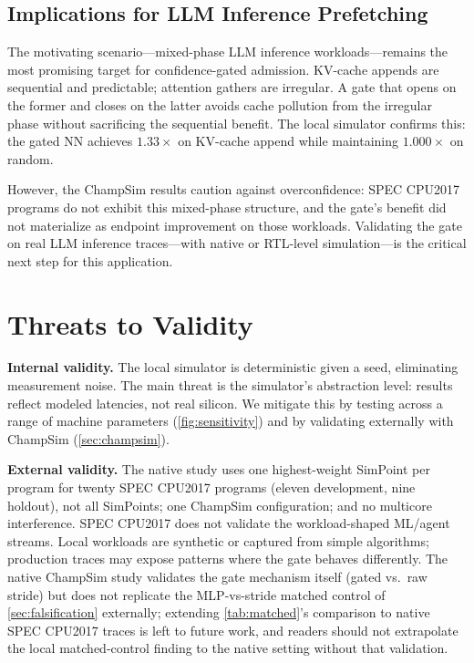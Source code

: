 \documentclass[sigplan,anonymous,review,nonacm]{acmart}
\begin{document}
\subsection{Implications for LLM Inference Prefetching}

The motivating scenario---mixed-phase LLM inference workloads---remains
the most promising target for confidence-gated admission. KV-cache appends
are sequential and predictable; attention gathers are irregular. A gate
that opens on the former and closes on the latter avoids cache pollution
from the irregular phase without sacrificing the sequential benefit. The
local simulator confirms this: the gated NN achieves $1.33\times$ on
KV-cache append while maintaining $1.000\times$ on random.

However, the ChampSim results caution against overconfidence: SPEC CPU2017
programs do not exhibit this mixed-phase structure, and the gate's benefit
did not materialize as endpoint improvement on those workloads. Validating
the gate on real LLM inference traces---with native or RTL-level
simulation---is the critical next step for this application.

\section{Threats to Validity}
\label{sec:threats}

\textbf{Internal validity.} The local simulator is deterministic given a
seed, eliminating measurement noise. The main threat is the simulator's
abstraction level: results reflect modeled latencies, not real silicon. We
mitigate this by testing across a range of machine parameters
(\cref{fig:sensitivity}) and by validating externally with
ChampSim (\cref{sec:champsim}).

\textbf{External validity.} The native study uses one highest-weight
SimPoint per program for twenty SPEC CPU2017 programs (eleven development,
nine holdout), not all SimPoints; one ChampSim configuration; and no
multicore interference. SPEC CPU2017 does not validate the workload-shaped
ML/agent streams. Local workloads are synthetic or captured from simple
algorithms; production traces may expose patterns where the gate behaves
differently.
The native ChampSim study validates the gate mechanism itself (gated vs.\
raw stride) but does not replicate the MLP-vs-stride matched control of
\cref{sec:falsification} externally; extending \cref{tab:matched}'s
comparison to native SPEC CPU2017 traces is left to future work, and
readers should not extrapolate the local matched-control finding to the
native setting without that validation.
\end{document}
